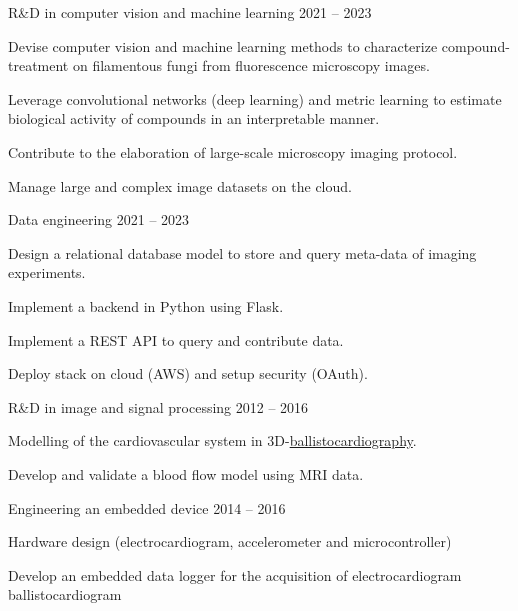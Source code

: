 \documentclass[12pt,a4paper]{awesome-cv}
\begin{document}
\label{sec:org97a6865}

\begin{cventries}



\cvsubentry
{R\&D in computer vision and machine learning}
{2021 -- 2023}
{\begin{cvitems}
\item Devise computer vision and machine learning methods to characterize compound-treatment on filamentous fungi from fluorescence microscopy images.
\item Leverage convolutional networks (deep learning) and metric learning to estimate biological activity of compounds in an interpretable manner.
\item Contribute to the elaboration of large-scale microscopy imaging protocol.
\item Manage large and complex image datasets on the cloud.
\end{cvitems}
}


\cvsubentry
{Data engineering}
{2021 -- 2023}
{\begin{cvitems}
\item Design a relational database model to store and query meta-data of imaging experiments.
\item Implement a backend in Python using Flask.
\item Implement a REST API to query and contribute data.
\item Deploy stack on cloud (AWS) and setup security (OAuth).
\end{cvitems}
}



\cvsubentry
{R\&D in image and signal processing}
{2012 -- 2016}
{\begin{cvitems}
\item Modelling of the cardiovascular system in
3D-\href{https://www.ncbi.nlm.nih.gov/pmc/articles/PMC4274997/}{ballistocardiography}.
\item Develop and validate a blood flow model using MRI data.
\end{cvitems}
}


\cvsubentry
{Engineering an embedded device}
{2014 -- 2016}
{\begin{cvitems}
\item Hardware design (electrocardiogram, accelerometer and microcontroller)
\item Develop an embedded data logger for the acquisition of electrocardiogram ballistocardiogram
\end{cvitems}
}
\end{cventries}
\end{document}
